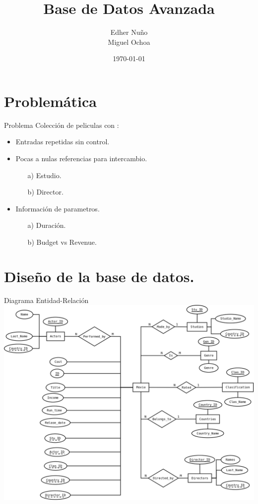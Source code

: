 \documentclass{beamer}%
\title{Base de Datos Avanzada}%
\date{\today}%
\author{Edher Nu\~no \\ Miguel Ochoa} %
\institute{Universidad Aut\'onoma de Guadalajara}
\begin{document}
\maketitle %

\section{Problem\'atica}

\begin{frame}{Problema}
Colecci\'on de peliculas con :
\begin{itemize}
\item Entradas repetidas sin control.
\item Pocas a nulas referencias para intercambio.
	\begin{itemize}	%
		\item[a)] Estudio.
		\item[b)] Director.
	\end{itemize}	
\item Informaci\'on de parametros.
	\begin{itemize}
		\item[a)] Duraci\'on.
		\item[b)] Budget vs Revenue.
	\end{itemize}		
\end{itemize}
\end{frame}

\section{Dise\~no de la base de datos.}
\begin{frame}{Diagrama Entidad-Relaci\'on}
\centering
\includegraphics[scale=0.295]{figures/entidad_relacion_01.png}
\end{frame}
\end{document}
